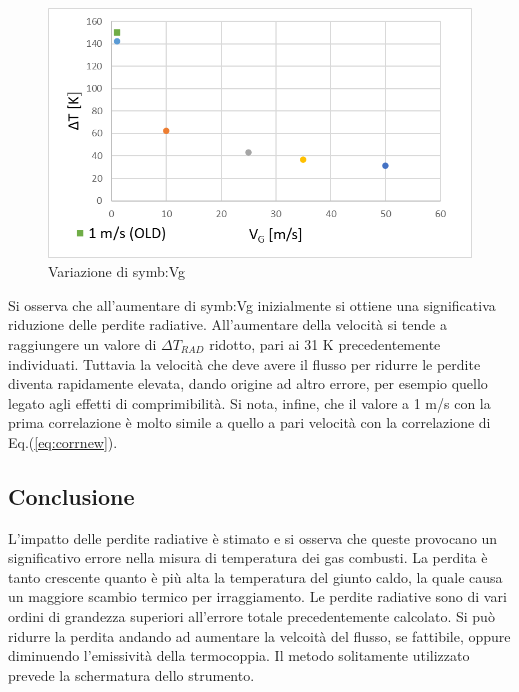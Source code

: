 \begin{figure}[H]
	\centering
	\includegraphics[width=0.7\linewidth]{"../sperimentazione nei propulsori/varV"}
	\caption{Variazione di \gls{symb:Vg}}
	\label{fig:varv}
\end{figure}

Si osserva che all'aumentare di \gls{symb:Vg} inizialmente si ottiene una significativa riduzione delle perdite radiative. All'aumentare della velocità si tende a raggiungere un valore di $\Delta T_{\textit{RAD}}$ ridotto, pari ai 31 K precedentemente individuati. Tuttavia la velocità che deve avere il flusso per ridurre le perdite diventa rapidamente elevata, dando origine ad altro errore, per esempio quello legato agli effetti di comprimibilità. Si nota, infine, che il valore a 1 m/s con la prima correlazione è molto simile a quello a pari velocità con la correlazione di Eq.(\ref{eq:corrnew}).

\subsection{Conclusione}
L'impatto delle perdite radiative è stimato e si osserva che queste provocano un significativo errore nella misura di temperatura dei gas combusti. La perdita è tanto crescente quanto è più alta la temperatura del giunto caldo, la quale causa un maggiore scambio termico per irraggiamento. Le perdite radiative sono di vari ordini di grandezza superiori all'errore totale precedentemente calcolato. Si può ridurre la perdita andando ad aumentare la velcoità del flusso, se fattibile, oppure diminuendo l'emissività della termocoppia. Il metodo solitamente utilizzato prevede la schermatura dello strumento. 